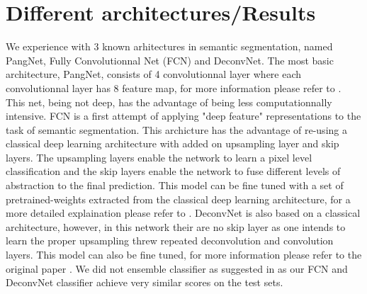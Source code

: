\documentclass{article}
\begin{document}
\section{Different architectures/Results}
\label{sec:results}
We experience with 3 known arhitectures in semantic segmentation, named PangNet, Fully Convolutionnal Net (FCN) and DeconvNet. The most basic architecture, PangNet, consists of 4 
convolutionnal layer where each convolutionnal layer has 8 feature map, for more information please refer to \cite{pang2010cell}. 
This net, being not deep, has the advantage of being less 
computationnally intensive. FCN is a first attempt of applying "deep 
feature" representations to the task of semantic segmentation. This 
archicture has the advantage of re-using a classical deep learning 
architecture with added on upsampling layer and skip layers. The 
upsampling layers enable the network to learn a pixel level classification 
and the skip layers enable the network to fuse different levels of 
abstraction to the final prediction. This model can be fine tuned with a 
set of pretrained-weights extracted from the classical deep learning 
architecture, for a more detailed explaination please refer to \cite{long2015fcn}. DeconvNet is also based on a classical architecture, 
however, in this network their are no skip layer as one intends to learn 
the proper upsampling threw repeated deconvolution and convolution 
layers. This model can also be fine tuned, for more information please 
refer to the original paper \cite{noh2015learning}. We did not
ensemble classifier as suggested in 
\cite{noh2015learning} as our FCN and DeconvNet classifier achieve very similar scores on the test sets.
\end{document}
